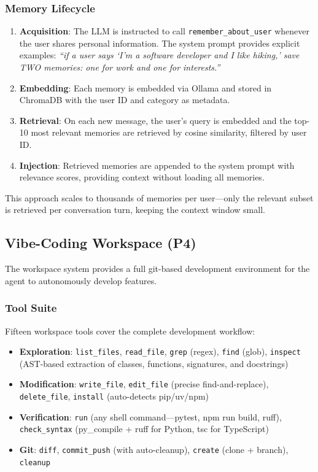 \subsubsection{Memory Lifecycle}

\begin{enumerate}[leftmargin=*]
  \item \textbf{Acquisition}: The LLM is instructed to call \texttt{remember\_about\_user} whenever the user shares personal information. The system prompt provides explicit examples: \textit{``if a user says `I'm a software developer and I like hiking,' save TWO memories: one for work and one for interests.''}
  \item \textbf{Embedding}: Each memory is embedded via Ollama and stored in ChromaDB with the user ID and category as metadata.
  \item \textbf{Retrieval}: On each new message, the user's query is embedded and the top-10 most relevant memories are retrieved by cosine similarity, filtered by user ID.
  \item \textbf{Injection}: Retrieved memories are appended to the system prompt with relevance scores, providing context without loading all memories.
\end{enumerate}

This approach scales to thousands of memories per user---only the relevant subset is retrieved per conversation turn, keeping the context window small.

\subsection{Vibe-Coding Workspace (P4)}

The workspace system provides a full git-based development environment for the agent to autonomously develop features.

\subsubsection{Tool Suite}

Fifteen workspace tools cover the complete development workflow:

\begin{itemize}[leftmargin=*]
  \item \textbf{Exploration}: \texttt{list\_files}, \texttt{read\_file}, \texttt{grep} (regex), \texttt{find} (glob), \texttt{inspect} (AST-based extraction of classes, functions, signatures, and docstrings)
  \item \textbf{Modification}: \texttt{write\_file}, \texttt{edit\_file} (precise find-and-replace), \texttt{delete\_file}, \texttt{install} (auto-detects pip/uv/npm)
  \item \textbf{Verification}: \texttt{run} (any shell command---pytest, npm run build, ruff), \texttt{check\_syntax} (py\_compile + ruff for Python, tsc for TypeScript)
  \item \textbf{Git}: \texttt{diff}, \texttt{commit\_push} (with auto-cleanup), \texttt{create} (clone + branch), \texttt{cleanup}
\end{itemize}

